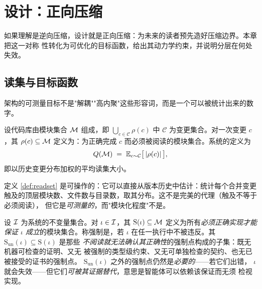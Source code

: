 \chapter{设计：正向压缩}\label{ch:design}

如果理解是逆向压缩，设计就是正向压缩：为未来的读者预先造好压缩边界。本章把这一对称
性转化为可优化的目标函数，给出其动力学约束，并说明分层在何处失效。

\section{读集与目标函数}\label{sec:readset}

架构的可测量目标不是"解耦""高内聚"这些形容词，而是一个可以被统计出来的数字。

\begin{definition}[变更读集]\label{def:readset}
设代码库由模块集合 $\mathcal{M}$ 组成，即 $\bigcup_{c \in \mathcal{C}} \rho(c)$ 中
$\mathcal{C}$ 为变更集合。对一次变更 $c$，其 $\rho(c) \subseteq \mathcal{M}$
定义为：为正确完成 $c$ 而必须被阅读的模块集合。系统的定义为
\begin{equation}\label{eq:readset}
Q(\mathcal{M}) \;=\; \mathbb{E}_{c \sim \mathcal{C}}\bigl[\,|\rho(c)|\,\bigr],
\end{equation}
即以历史变更分布加权的平均读集大小。
\end{definition}

定义 \ref{def:readset} 是可操作的：它可以直接从版本历史中估计：统计每个合并变更
触及的顶层模块数、文件数与目录数，取其分布。这不是完美的代理（触及不等于必须阅读），
但它是\emph{可测量的}，而"模块化程度"不是。

\begin{definition}[不变量的强制点]\label{def:enforce}
设 $\mathcal{I}$ 为系统的不变量集合。对 $\iota \in \mathcal{I}$，其
$\mathrm{S}(\iota) \subseteq \mathcal{M}$ 定义为所有\emph{必须正确实现才能保证 $\iota$
成立}的模块集合。称强制是，若 $\iota$ 在任一执行中不被违反。其
 $\mathrm{S}_{\mathrm{un}}(\iota) \subseteq \mathrm{S}(\iota)$
是那些 \emph{不阅读就无法确认其正确性}的强制点构成的子集：既无机器可检查的证明、又无
被强制的类型级约束、又无可单独检查的契约、也无已被接受的证书的强制点。
$\mathrm{S}_{\mathrm{un}}(\iota)$ 之外的强制点仍然是\emph{必要的}——若它们出错，
$\iota$ 就会失效——但它们\emph{可被其证据替代}，意思是智能体可以依赖该保证而无须
检视实现。
\end{definition}

